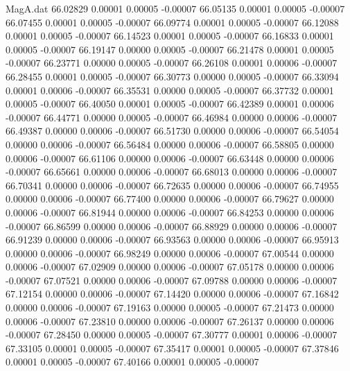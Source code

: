 \begin{filecontents}{MagA.dat}
  66.02829    0.00001    0.00005   -0.00007
  66.05135    0.00001    0.00005   -0.00007
  66.07455    0.00001    0.00005   -0.00007
  66.09774    0.00001    0.00005   -0.00007
  66.12088    0.00001    0.00005   -0.00007
  66.14523    0.00001    0.00005   -0.00007
  66.16833    0.00001    0.00005   -0.00007
  66.19147    0.00000    0.00005   -0.00007
  66.21478    0.00001    0.00005   -0.00007
  66.23771    0.00000    0.00005   -0.00007
  66.26108    0.00001    0.00006   -0.00007
  66.28455    0.00001    0.00005   -0.00007
  66.30773    0.00000    0.00005   -0.00007
  66.33094    0.00001    0.00006   -0.00007
  66.35531    0.00000    0.00005   -0.00007
  66.37732    0.00001    0.00005   -0.00007
  66.40050    0.00001    0.00005   -0.00007
  66.42389    0.00001    0.00006   -0.00007
  66.44771    0.00000    0.00005   -0.00007
  66.46984    0.00000    0.00006   -0.00007
  66.49387    0.00000    0.00006   -0.00007
  66.51730    0.00000    0.00006   -0.00007
  66.54054    0.00000    0.00006   -0.00007
  66.56484    0.00000    0.00006   -0.00007
  66.58805    0.00000    0.00006   -0.00007
  66.61106    0.00000    0.00006   -0.00007
  66.63448    0.00000    0.00006   -0.00007
  66.65661    0.00000    0.00006   -0.00007
  66.68013    0.00000    0.00006   -0.00007
  66.70341    0.00000    0.00006   -0.00007
  66.72635    0.00000    0.00006   -0.00007
  66.74955    0.00000    0.00006   -0.00007
  66.77400    0.00000    0.00006   -0.00007
  66.79627    0.00000    0.00006   -0.00007
  66.81944    0.00000    0.00006   -0.00007
  66.84253    0.00000    0.00006   -0.00007
  66.86599    0.00000    0.00006   -0.00007
  66.88929    0.00000    0.00006   -0.00007
  66.91239    0.00000    0.00006   -0.00007
  66.93563    0.00000    0.00006   -0.00007
  66.95913    0.00000    0.00006   -0.00007
  66.98249    0.00000    0.00006   -0.00007
  67.00544    0.00000    0.00006   -0.00007
  67.02909    0.00000    0.00006   -0.00007
  67.05178    0.00000    0.00006   -0.00007
  67.07521    0.00000    0.00006   -0.00007
  67.09788    0.00000    0.00006   -0.00007
  67.12154    0.00000    0.00006   -0.00007
  67.14420    0.00000    0.00006   -0.00007
  67.16842    0.00000    0.00006   -0.00007
  67.19163    0.00000    0.00005   -0.00007
  67.21473    0.00000    0.00006   -0.00007
  67.23810    0.00000    0.00006   -0.00007
  67.26137    0.00000    0.00006   -0.00007
  67.28450    0.00000    0.00005   -0.00007
  67.30777    0.00001    0.00006   -0.00007
  67.33105    0.00001    0.00005   -0.00007
  67.35417    0.00001    0.00005   -0.00007
  67.37846    0.00001    0.00005   -0.00007
  67.40166    0.00001    0.00005   -0.00007

\end{filecontents}
